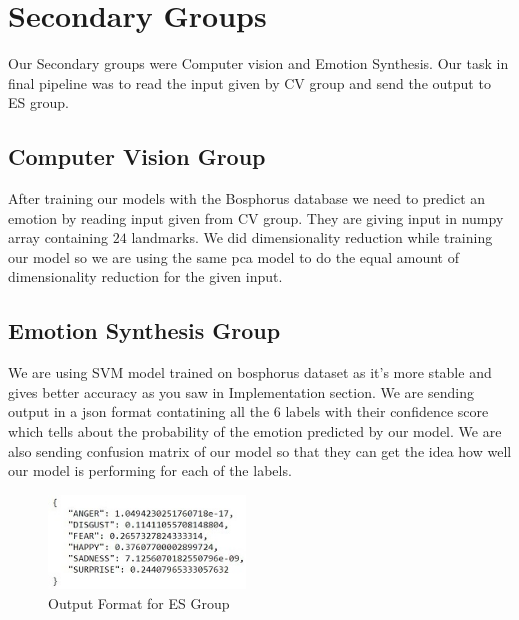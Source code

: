 \section{Secondary Groups}

Our Secondary groups were Computer vision and Emotion Synthesis. Our task in final pipeline was to read the input given by CV group and send the output to ES group.

\subsection{Computer Vision Group}
After training our models with the Bosphorus database we need to predict an emotion by reading input given from CV group. They are giving input in numpy array containing $24$ landmarks. We did dimensionality reduction while training our model so we are using the same pca model to do the equal amount of dimensionality reduction for the given input. 

\subsection{Emotion Synthesis Group}
We are using SVM model trained on bosphorus dataset as it's more stable and gives better accuracy as you saw in Implementation section. We are sending output in a json format contatining all the 6 labels with their confidence score which tells about the probability of the emotion predicted by our model. We are also sending confusion matrix of our model so that they can get the idea how well our model is performing for each of the labels.


\begin{figure}[H]
    \centering
    \includegraphics[height= 25mm]{figures/emotion_output.jpg}
    \caption{Output Format for ES Group}
    \label{emotion_output}
\end{figure}


